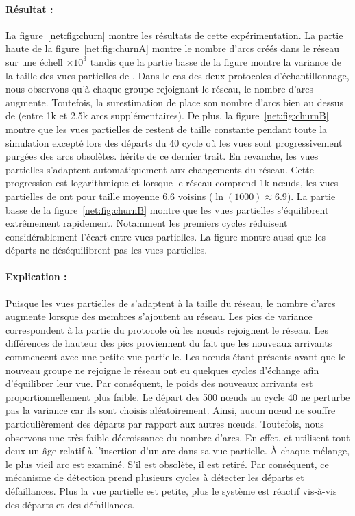 \paragraph{Résultat :} La figure~\ref{net:fig:churn} montre les résultats de
cette expérimentation. La partie haute de la figure~\ref{net:fig:churnA} montre
le nombre d'arcs créés dans le réseau sur une échell $\times 10^3$ tandis que la
partie basse de la figure montre la variance de la taille des vues partielles de
\SPRAY. Dans le cas des deux protocoles d'échantillonnage, nous observons qu'à
chaque groupe rejoignant le réseau, le nombre d'arcs augmente. Toutefois, la
surestimation de \CYCLON place son nombre d'arcs bien au dessus de \SPRAY (entre
1k et 2.5k arcs supplémentaires). De plus, la figure~\ref{net:fig:churnB} montre
que les vues partielles de \CYCLON restent de taille constante pendant toute la
simulation excepté lors des départs du $40$ cycle où les vues sont
progressivement purgées des arcs obsolètes. \SPRAY hérite de ce dernier
trait. En revanche, les vues partielles s'adaptent automatiquement aux
changements du réseau. Cette progression est logarithmique et lorsque le réseau
comprend 1k nœuds, les vues partielles de \SPRAY ont pour taille moyenne 6.6
voisins ($\ln(1000)\approx6.9$). La partie basse de la
figure~\ref{net:fig:churnB} montre que les vues partielles s'équilibrent
extrêmement rapidement. Notamment les premiers cycles réduisent considérablement
l'écart entre vues partielles. La figure montre aussi que les départs ne
déséquilibrent pas les vues partielles.

\paragraph{Explication :} Puisque les vues partielles de \SPRAY s'adaptent à la
taille du réseau, le nombre d'arcs augmente lorsque des membres s'ajoutent au
réseau. Les pics de variance correspondent à la partie du protocole où les nœuds
rejoignent le réseau. Les différences de hauteur des pics proviennent du fait
que les nouveaux arrivants commencent avec une petite vue partielle. Les nœuds
étant présents avant que le nouveau groupe ne rejoigne le réseau ont eu quelques
cycles d'échange afin d'équilibrer leur vue. Par conséquent, le poids des
nouveaux arrivants est proportionnellement plus faible. Le départ des 500 nœuds
au cycle 40 ne perturbe pas la variance car ils sont choisis
aléatoirement. Ainsi, aucun nœud ne souffre particulièrement des départs par
rapport aux autres nœuds. Toutefois, nous observons une très faible décroissance
du nombre d'arcs. En effet, \CYCLON et \SPRAY utilisent tout deux un âge relatif
à l'insertion d'un arc dans sa vue partielle. À chaque mélange, le plus vieil
arc est examiné. S'il est obsolète, il est retiré. Par conséquent, ce mécanisme
de détection prend plusieurs cycles à détecter les départs et défaillances. Plus
la vue partielle est petite, plus le système est réactif vis-à-vis des départs
et des défaillances.

